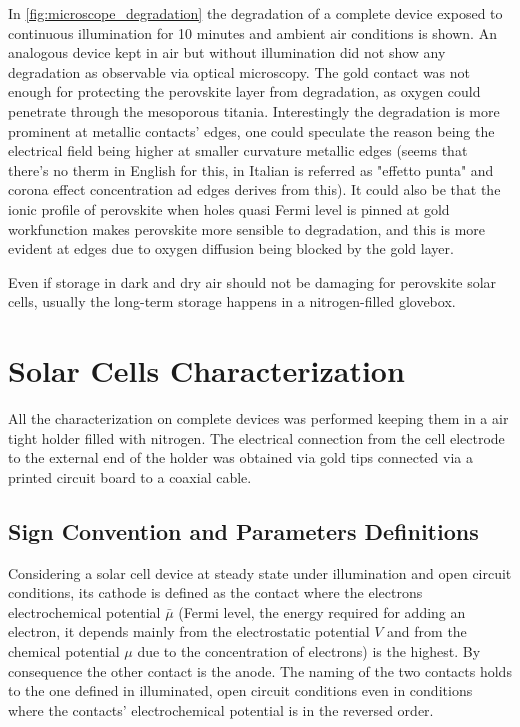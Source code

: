 		In \cref{fig:microscope_degradation} the degradation of a complete device exposed to continuous illumination for 10 minutes and ambient air conditions is shown. An analogous device kept in air but without illumination did not show any degradation as observable via optical microscopy. The gold contact was not enough for protecting the perovskite layer from degradation, as oxygen could penetrate through the mesoporous titania. Interestingly the degradation is more prominent at metallic contacts' edges, one could speculate the reason being the electrical field being higher at smaller curvature metallic edges (seems that there's no therm in English for this, in Italian is referred as "effetto punta" and corona effect concentration ad edges derives from this). It could also be that the ionic profile of perovskite when holes quasi Fermi level is pinned at gold workfunction makes perovskite more sensible to degradation, and this is more evident at edges due to oxygen diffusion being blocked by the gold layer.

		Even if storage in dark and dry air should not be damaging for perovskite solar cells, usually the long-term storage happens in a nitrogen-filled glovebox.

\section{Solar Cells Characterization}

	All the characterization on complete devices was performed keeping them in a air tight holder filled with nitrogen. The electrical connection from the cell electrode to the external end of the holder was obtained via gold tips connected via a printed circuit board to a coaxial cable.
	
	\subsection{Sign Convention and Parameters Definitions}
	
	Considering a solar cell device at steady state under illumination and open circuit conditions, its cathode is defined as the contact where the electrons electrochemical potential $\bar\mu$ (Fermi level, the energy required for adding an electron, it depends mainly from the electrostatic potential $V$ and from the chemical potential $\mu$ due to the concentration of electrons) is the highest. By consequence the other contact is the anode. The naming of the two contacts holds to the one defined in illuminated, open circuit conditions even in conditions where the contacts' electrochemical potential is in the reversed order.
	
